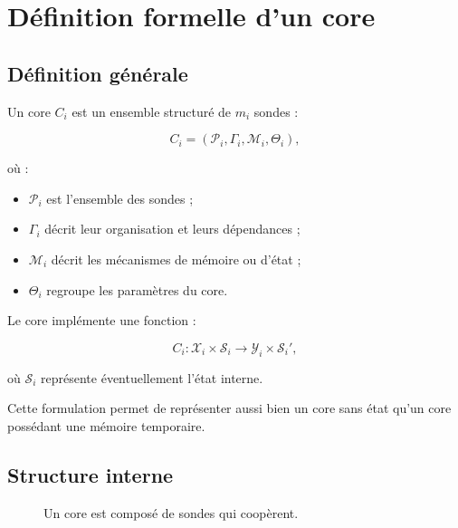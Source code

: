 \documentclass[11pt,a4paper]{article}
\begin{document}
\section{Définition formelle d'un core}

\subsection{Définition générale}

Un core $C_i$ est un ensemble structuré de $m_i$ sondes :

\[
C_i =
\left(
\mathcal{P}_i,
\Gamma_i,
\mathcal{M}_i,
\Theta_i
\right),
\]

où :

\begin{itemize}
  \item $\mathcal{P}_i$ est l'ensemble des sondes ;
  \item $\Gamma_i$ décrit leur organisation et leurs dépendances ;
  \item $\mathcal{M}_i$ décrit les mécanismes de mémoire ou d'état ;
  \item $\Theta_i$ regroupe les paramètres du core.
\end{itemize}

Le core implémente une fonction :

\[
C_i :
\mathcal{X}_i
\times
\mathcal{S}_i
\rightarrow
\mathcal{Y}_i
\times
\mathcal{S}_i',
\]

où $\mathcal{S}_i$ représente éventuellement l'état interne.

Cette formulation permet de représenter aussi bien un core sans état
qu'un core possédant une mémoire temporaire.

\subsection{Structure interne}

\begin{figure}[H]
\centering
{}
\caption{Un core est composé de sondes qui coopèrent.}
\end{figure}
\end{document}
